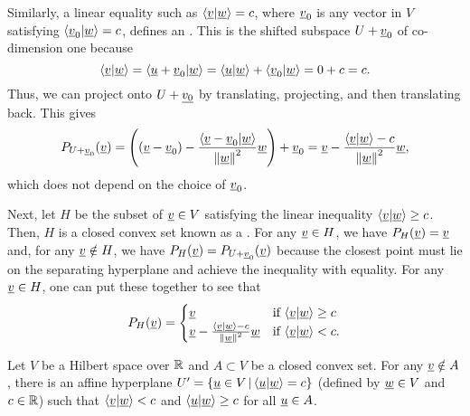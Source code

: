 Similarly, a linear equality such as $\langle\underline v|\underline w\rangle=c$, where $\underline v_{0}$ is any vector in $V$ satisfying $\langle\underline v_{0}|\underline w\rangle=c$,  defines an .
This is the shifted subspace $U+\underline v_{0}$ of co-dimension one because 
\[
\langle\underline v|\underline w\rangle=\langle\underline u+\underline v_{0}|\underline w\rangle=\langle\underline u|\underline w\rangle+\langle\underline v_{0}|\underline w\rangle=0+c=c.
\]
Thus, we can project onto $U+\underline{v_{0}}$ by translating, projecting, and then translating back. This gives
\begin{equation*}
P_{U+\underline v_{0}}(\underline v)=\left((\underline v-\underline v_{0})-\frac{\left\langle \underline v-\underline v_{0}|\underline w\right\rangle }{\left\Vert \underline w\right\Vert ^{2}}\underline w\right)+\underline v_{0}=\underline v-\frac{\left\langle \underline v|\underline w\right\rangle -c}{\left\Vert \underline w\right\Vert ^{2}}\underline w,\label{eq:proj_lin_eq}
\end{equation*}
which does not depend on the choice of $\underline v_{0}$.

Next, let $H$ be the subset of $\underline v\in V$ satisfying the linear inequality $\langle\underline v|\underline w\rangle\geq c$. Then, $H$ is a closed convex set known as a . For any $\underline v\in H$, we have $P_{H}(\underline v)=\underline v$ and, for any $\underline v\notin H$, we have $P_{H}(\underline v)=P_{U+\underline v_{0}}(\underline v)$ because the closest point must lie on the separating hyperplane and achieve the inequality with equality. For any $\underline v\in H$, one can put these together to see that
\begin{equation}
P_{H}(\underline v)=\begin{cases}
\underline v & \text{if }\langle\underline v|\underline w\rangle\geq c\\
\underline v-\frac{\left\langle \underline v|\underline w\right\rangle -c}{\left\Vert \underline w\right\Vert ^{2}}\underline w & \text{if }\langle\underline v|\underline w\rangle<c.
\end{cases}\label{eq:proj_ineq}
\end{equation}

\begin{theorem} \label{theorem:convex_point_set_hyperplane}
Let $V$ be a Hilbert space over $\mathbb{R}$ and $A\subset V$ be a closed convex set.
For any $\underline{v} \notin A$, there is an affine hyperplane $U' = \{ \underline{u} \in V \,|\, \langle \underline{u} | \underline{w} \rangle = c \}$ (defined by $\underline{w} \in V$ and $c\in \mathbb{R}$) such that $\langle \underline{v} | \underline{w} \rangle < c$ and $\langle \underline{u} | \underline{w} \rangle \geq c$ for all $\underline{u} \in A$.
\end{theorem}

